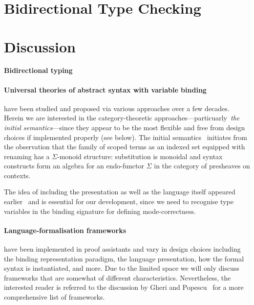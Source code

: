 \documentclass[envcountsect,runningheads,a4paper]{llncs}
\begin{document}
\section{Bidirectional Type Checking}
\section{Discussion}

\paragraph{Bidirectional typing}
\cite{Pierce2000a,Dunfield2021}

\paragraph{Universal theories of abstract syntax with variable binding} have been studied and proposed via various approaches over a few decades.
Herein we are interested in the category-theoretic approaches---particuarly \emph{the initisl semantics}---since they appear to be the most flexible and free from design choices if implemented properly (see below).
The initial semantics~\cite{Fiore1999} initiates from the observation that the family of scoped terms as an indexed set equipped with renaming has a $\Sigma$-monoid structure: substitution is monoidal and syntax constructs form an algebra for an endo-functor $\Sigma$ in the category of presheaves on contexts.


The idea of including the presentation as well as the language itself appeared earlier~\cite{Hamana2011a,Fiore2013a,Arkor2020} and is essential for our development, since we need to recognise type variables in the binding signature for defining mode-correctness.


\paragraph{Language-formalisation frameworks} have been implemented in proof assistants and vary in design choices including the binding representation paradigm, the language presentation, how the formal syntax is instantiated, and more.
Due to the limited space we will only discuss frameworks that are somewhat of different characteristics.
Nevertheless, the interested reader is referred to the discussion by Gheri and Popescu~\cite[Section 8]{Gheri2020} for a more comprehensive list of frameworks.
\end{document}
